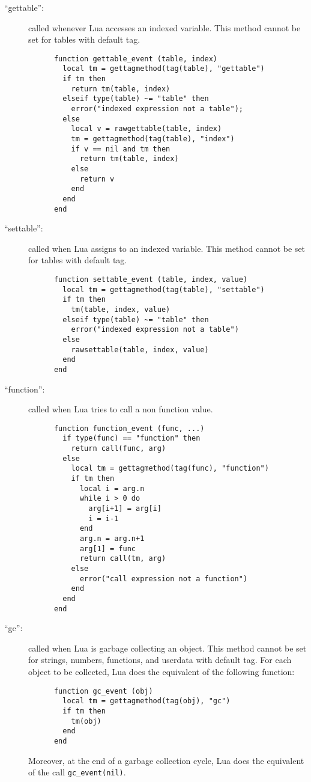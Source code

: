 \documentclass[11pt]{article}
\begin{document}
\begin{description}
\item[``gettable'':]
called whenever Lua accesses an indexed variable.
This method cannot be set for tables with default tag.
\begin{verbatim}
      function gettable_event (table, index)
        local tm = gettagmethod(tag(table), "gettable")
        if tm then
          return tm(table, index)
        elseif type(table) ~= "table" then
          error("indexed expression not a table");
        else
          local v = rawgettable(table, index)
          tm = gettagmethod(tag(table), "index")
          if v == nil and tm then
            return tm(table, index)
          else
            return v
          end
        end
      end
\end{verbatim}

\item[``settable'':]
called when Lua assigns to an indexed variable.
This method cannot be set for tables with default tag.
\begin{verbatim}
      function settable_event (table, index, value)
        local tm = gettagmethod(tag(table), "settable")
        if tm then
          tm(table, index, value)
        elseif type(table) ~= "table" then
          error("indexed expression not a table")
        else
          rawsettable(table, index, value)
        end
      end
\end{verbatim}

\item[``function'':]
called when Lua tries to call a non function value.
\begin{verbatim}
      function function_event (func, ...)
        if type(func) == "function" then
          return call(func, arg)
        else
          local tm = gettagmethod(tag(func), "function")
          if tm then
            local i = arg.n
            while i > 0 do
              arg[i+1] = arg[i]
              i = i-1
            end
            arg.n = arg.n+1
            arg[1] = func
            return call(tm, arg)
          else
            error("call expression not a function")
          end
        end
      end
\end{verbatim}

\item[``gc'':]
called when Lua is garbage collecting an object.
This method cannot be set for strings, numbers, functions,
and userdata with default tag.
For each object to be collected,
Lua does the equivalent of the following function:
\begin{verbatim}
      function gc_event (obj)
        local tm = gettagmethod(tag(obj), "gc")
        if tm then
          tm(obj)
        end
      end
\end{verbatim}
Moreover, at the end of a garbage collection cycle,
Lua does the equivalent of the call \verb|gc_event(nil)|.

\end{description}
\end{document}
